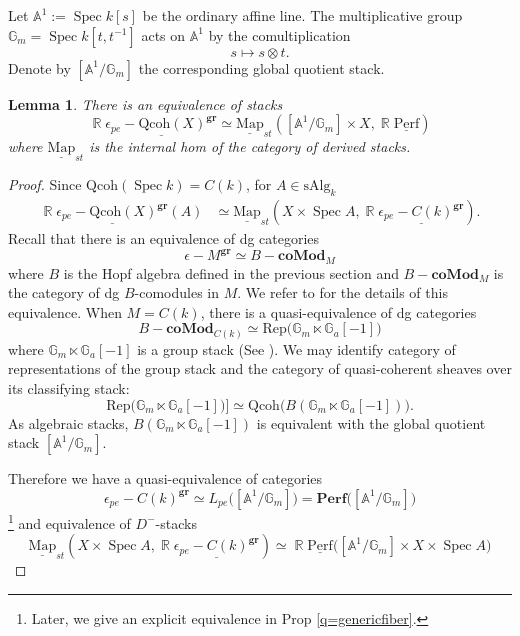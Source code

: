 \documentclass[reqno]{amsart}
\DeclareMathOperator\R{\mathbb R}
\newtheorem{lemma}[theorem]{Lemma}
\theoremstyle{definition}
\theoremstyle{remark}
\newcommand{\G}{{\mathbb G}}
\newcommand{\A}{{\mathbb A}}
\newcommand{\ot}{\otimes}
\newcommand{\ul}{\underline}
\newcommand{\Spec}{\operatorname{Spec}}
\newcommand{\perf}{\mathbf{Perf}}
\newcommand{\uperf}{\ul{\mathrm{Perf}}}
\newcommand{\gr}{\mathbf{gr}}
\newcommand{\ep}{\epsilon}
\newcommand{\ska}{{\mathrm{sAlg}}_k}
\newcommand{\Map}{{\mathrm{Map}}}
\newcommand{\comod}{\mathbf{coMod}}
\newcommand{\QC}{\mathrm{Qcoh}}
\numberwithin{equation}{section}
\begin{document}
Let $\A^1:=\Spec k[s]$ be the ordinary affine line. The multiplicative group $\G_m=\Spec k[t,t^{-1}]$ acts on $\A^1$ by the comultiplication
\[
s\mapsto s\ot t.
\]
Denote by $[\A^1\big/\G_m]$ the corresponding global quotient stack.


\begin{lemma}\label{lem:1}
There is an equivalence of stacks
\[
\R\ul{\ep_{pe}-\QC(X)^\gr}\simeq \ul{\Map}_{st}([\A^1\big/\G_m]\times X,\R\uperf)
\] where $\ul{\Map}_{st}$ is the internal hom of the category of derived stacks.
\end{lemma}
\begin{proof}
Since $\QC(\Spec k)=C(k)$,  for $A\in \ska$
\begin{align*}
\R\ul{\ep_{pe}-\QC(X)^\gr}(A)&\simeq  \ul{\Map}_{st}(X\times \Spec A,\R\ul{\ep_{pe}-C(k)^\gr}).
\end{align*}
Recall that there is an equivalence  of dg categories
\[
\ep-M^\gr\simeq B-\comod_M
\]
where $B$ is the Hopf algebra defined in the previous section and $B-\comod_M$ is the category of dg $B$-comodules in $M$. We refer to \cite[Section 1.1.1]{CPTVV} for the details of this equivalence. When $M=C(k)$, there is a quasi-equivalence of dg categories
\[
B-\comod_{C(k)}\simeq {\mathrm{Rep}}\Big(\G_m\ltimes \G_a[-1]\Big)
\] where $\G_m\ltimes \G_a[-1]$ is a group stack (See \cite[Remark 1.1.2]{CPTVV}). We may identify category of representations of the group stack and the category of quasi-coherent sheaves over its classifying stack:
\[
{\mathrm{Rep}}\Big(\G_m\ltimes \G_a[-1]\Big)]\simeq \QC\Big( B(\G_m\ltimes \G_a[-1])\Big).
\]
As algebraic stacks, $B(\G_m\ltimes \G_a[-1])$ is equivalent with the global quotient stack $[\A^1\big/\G_m]$. 

Therefore we have a quasi-equivalence of categories
\[
\ep_{pe}-C(k)^\gr\simeq L_{pe}\Big([\A^1\big/ \G_m]\Big)=\perf\Big([\A^1\big/ \G_m]\Big)
\] \footnote{Later, we give an explicit equivalence in Prop \ref{q=genericfiber}.}
and equivalence of $D^-$-stacks
\[
\ul{\Map}_{st}(X\times \Spec A,\R\ul{\ep_{pe}-C(k)^\gr})\simeq \R\uperf\Big([\A^1\big/ \G_m]\times X\times \Spec A\Big)
\]


\end{proof}
\end{document}
